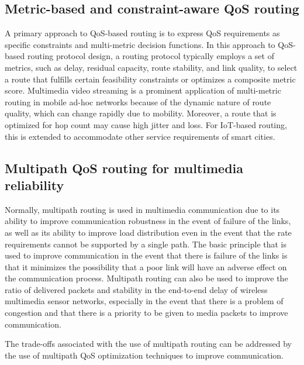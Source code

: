 \documentclass[12pt]{article}
\begin{document}
	\subsection{Metric-based and constraint-aware QoS routing}
    A primary approach\cite{Karunkuzhali202517951,Jara20211,Goyal2025321} to QoS-based routing is to express QoS requirements as specific constraints and multi-metric decision functions. In this approach to QoS-based routing protocol design, a routing protocol typically employs a set of metrics, such as delay, residual capacity, route stability, and link quality, to select a route that fulfills certain feasibility constraints or optimizes a composite metric score. Multimedia video streaming is a prominent application of multi-metric routing in mobile ad-hoc networks because of the dynamic nature of route quality, which can change rapidly due to mobility. Moreover, a route that is optimized for hop count may cause high jitter and loss. For IoT-based routing, this is extended to accommodate other service requirements of smart cities.
    \subsection{Multipath QoS routing for multimedia reliability}
    Normally, multipath routing \cite{Suseela20201248,Suguna2022,Srinivasulu2023,Abazeed2019CLMR} is used in multimedia communication due to its ability to improve communication robustness in the event of failure of the links, as well as its ability to improve load distribution even in the event that the rate requirements cannot be supported by a single path. The basic principle that is used to improve communication in the event that there is failure of the links is that it minimizes the possibility that a poor link will have an adverse effect on the communication process. Multipath routing can also be used to improve the ratio of delivered packets and stability in the end-to-end delay of wireless multimedia sensor networks, especially in the event that there is a problem of congestion and that there is a priority to be given to media packets to improve communication.

The trade-offs associated with the use of multipath routing can be addressed by the use of multipath QoS optimization techniques to improve communication.
\end{document}
